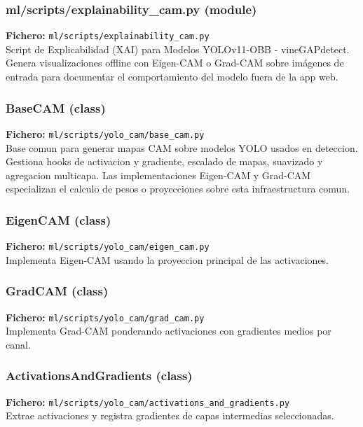 \subsubsection*{ml/scripts/explainability\_cam.py (module)}
\noindent\textbf{Fichero:} \texttt{ml/scripts/explainability\_cam.py}\\
Script de Explicabilidad (XAI) para Modelos YOLOv11-OBB - vineGAPdetect. Genera visualizaciones offline con Eigen-CAM o Grad-CAM sobre imágenes de entrada para documentar el comportamiento del modelo fuera de la app web.


\subsubsection*{BaseCAM (class)}
\noindent\textbf{Fichero:} \texttt{ml/scripts/yolo\_cam/base\_cam.py}\\
Base comun para generar mapas CAM sobre modelos YOLO usados en deteccion. Gestiona hooks de activacion y gradiente, escalado de mapas, suavizado y agregacion multicapa. Las implementaciones Eigen-CAM y Grad-CAM especializan el calculo de pesos o proyecciones sobre esta infraestructura comun.


\subsubsection*{EigenCAM (class)}
\noindent\textbf{Fichero:} \texttt{ml/scripts/yolo\_cam/eigen\_cam.py}\\
Implementa Eigen-CAM usando la proyeccion principal de las activaciones.


\subsubsection*{GradCAM (class)}
\noindent\textbf{Fichero:} \texttt{ml/scripts/yolo\_cam/grad\_cam.py}\\
Implementa Grad-CAM ponderando activaciones con gradientes medios por canal.


\subsubsection*{ActivationsAndGradients (class)}
\noindent\textbf{Fichero:} \texttt{ml/scripts/yolo\_cam/activations\_and\_gradients.py}\\
Extrae activaciones y registra gradientes de capas intermedias seleccionadas.


